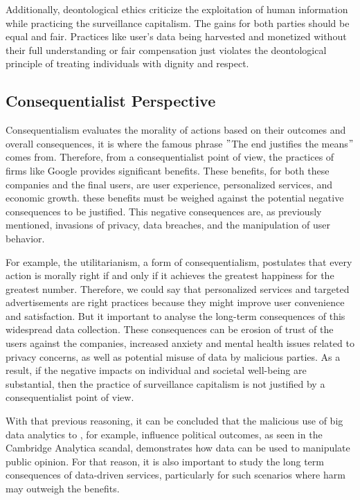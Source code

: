 Additionally, deontological ethics criticize the exploitation of human information while practicing the surveillance capitalism.
The gains for both parties should be equal and fair.
Practices like user's data being harvested and monetized without their full understanding or fair compensation just violates the deontological principle of treating individuals with dignity and respect.


\subsection{Consequentialist Perspective}\label{subsec:consequentialist-perspective}
Consequentialism evaluates the morality of actions based on their outcomes and overall consequences, it is where the famous phrase \("\)The end justifies the means\("\) comes from.
Therefore, from a consequentialist point of view, the practices of firms like Google provides significant benefits.
These benefits, for both these companies and the final users, are user experience, personalized services, and economic growth.
these benefits must be weighed against the potential negative consequences to be justified.
This negative consequences are, as previously mentioned, invasions of privacy, data breaches, and the manipulation of user behavior.

For example, the utilitarianism, a form of consequentialism, postulates that every action is morally right if and only if it achieves the greatest happiness for the greatest number\cite{Mill1863_Utilitarianism}.
Therefore, we could say that personalized services and targeted advertisements are right practices because they might improve user convenience and satisfaction.
But it important to analyse the long-term consequences of this widespread data collection.
These consequences can be erosion of trust of the users against the companies, increased anxiety and mental health issues related to privacy concerns, as well as potential misuse of data by malicious parties.
As a result, if the negative impacts on individual and societal well-being are substantial, then the practice of surveillance capitalism is not justified by a consequentialist point of view.

With that previous reasoning, it can be concluded that the malicious use of big data analytics to , for example, influence political outcomes, as seen in the Cambridge Analytica scandal, demonstrates how data can be used to manipulate public opinion.
For that reason, it is also important to study the long term consequences of data-driven services, particularly for such scenarios where harm may outweigh the benefits.


